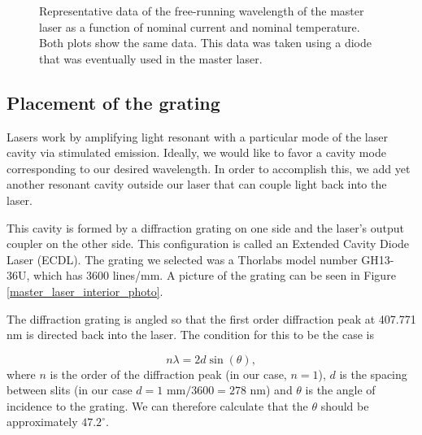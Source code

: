 \begin{figure}
\begin{subfigure}[b]{0.40\textwidth}
\label{currentandT:sfigb}
\end{subfigure}
\caption[Wavelength vs temperature and current]{\label{3dCurrentandTgraph} Representative data of the free-running wavelength of the master laser as a function of nominal current and nominal temperature. Both plots show the same data. This data was taken using a diode that was eventually used in the master laser.}
\end{figure}



\subsection{Placement of the grating}



Lasers work by amplifying light resonant with a particular mode of the laser cavity via stimulated emission. Ideally, we would like to favor a cavity mode corresponding to our desired wavelength. In order to accomplish this, we add yet another resonant cavity outside our laser that can couple light back into the laser. 

This cavity is formed by a diffraction grating on one side and the laser's output coupler on the other side. This configuration is called an Extended Cavity Diode Laser (ECDL). The grating we selected was a Thorlabs model number GH13-36U, which has 3600 lines/mm. A picture of the grating can be seen in Figure\,\ref{master_laser_interior_photo}. 

The diffraction grating is angled so that the first order diffraction peak at 407.771 nm is directed back into the laser. The condition for this to be the case is 

\begin{equation} \label{gratingEQn}
n \lambda = 2 d \sin (\theta),
\end{equation}
where $n$ is the order of the diffraction peak (in our case, $n=1$), $d$ is the spacing between slits (in our case $d=1$ mm$/3600 = 278 $ nm) and $\theta$ is the angle of incidence to the grating. We can therefore calculate that the $\theta$ should be approximately
\href{http://www.wolframalpha.com/input/?i=arcsin%28+407.771+nm+%2F%282*%281+mm%2F3600%29%29%29+in+degrees}{$47.2^\circ$}.

